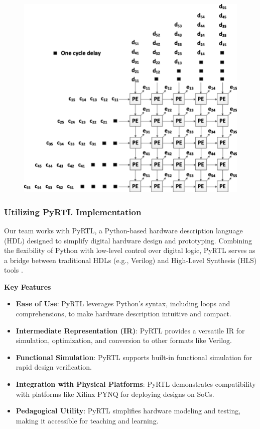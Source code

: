 \documentclass[12pt,letterpaper]{article}
\begin{document}
\pagebreak
\begin{figure}[htbp]
    \centering
    \includegraphics[width=14cm]{55-Systolic-array-architecture.png}
    \label{fig:Systolic array diagram}
\end{figure}

\subsubsection*{Utilizing PyRTL Implementation}

Our team works with PyRTL, a Python-based hardware description language (HDL) designed to simplify digital hardware design and prototyping. Combining the flexibility of Python with low-level control over digital logic, PyRTL serves as a bridge between traditional HDLs (e.g., Verilog) and High-Level Synthesis (HLS) tools \citep{clow2017pythonic}.

\textbf{Key Features}
\begin{itemize}
    \item \textbf{Ease of Use}: PyRTL leverages Python's syntax, including loops and comprehensions, to make hardware description intuitive and compact.
    \item \textbf{Intermediate Representation (IR)}: PyRTL provides a versatile IR for simulation, optimization, and conversion to other formats like Verilog.
    \item \textbf{Functional Simulation}: PyRTL supports built-in functional simulation for rapid design verification.
    \item \textbf{Integration with Physical Platforms}: PyRTL demonstrates compatibility with platforms like Xilinx PYNQ for deploying designs on SoCs.
    \item \textbf{Pedagogical Utility}: PyRTL simplifies hardware modeling and testing, making it accessible for teaching and learning.
\end{itemize}
\end{document}
